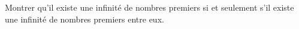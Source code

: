 \exercice

Montrer qu'il existe une infinité de nombres premiers si et seulement s'il existe une infinité de nombres premiers entre eux.

